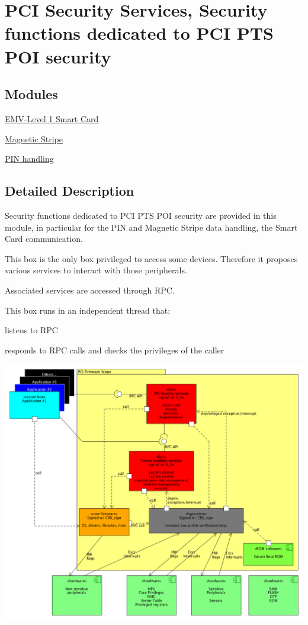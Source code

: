 \hypertarget{group__pcibx}{}\section{P\+CI Security Services, Security functions dedicated to P\+CI P\+TS P\+OI security}
\label{group__pcibx}
\subsection*{Modules}
\begin{DoxyCompactItemize}
\item 
\hyperlink{group__pcibx__sc}{E\+M\+V-\/\+Level 1 Smart Card}
\item 
\hyperlink{group__pcibx___m_s_r}{Magnetic Stripe}
\item 
\hyperlink{group__pcibx___p_i_n}{P\+I\+N handling}
\end{DoxyCompactItemize}


\subsection{Detailed Description}
Security functions dedicated to P\+CI P\+TS P\+OI security are provided in this module, in particular for the P\+IN and Magnetic Stripe data handling, the Smart Card communication.

This box is the only box privileged to access some devices. Therefore it proposes various services to interact with those peripherals.

Associated services are accessed through R\+PC.

This box runs in an independent thread that\+:
\begin{DoxyItemize}
\item listens to R\+PC
\item responds to R\+PC calls and checks the privileges of the caller
\end{DoxyItemize}


\begin{DoxyImageNoCaption}
  \mbox{\includegraphics[width=\textwidth,height=\textheight/2,keepaspectratio=true]{pci_cortex.png}}
\end{DoxyImageNoCaption}
  